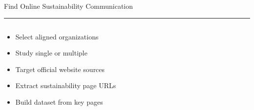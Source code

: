 \documentclass[aspectratio=169]{beamer}
\newcommand{\TitleFont}{\rmfamily}
\begin{document}
\begin{frame}[t]{}
  \vspace*{0.5cm}
  {\TitleFont\fontsize{18}{22}\selectfont\color{LUBronze}Find Online Sustainability Communication\par}
  \vspace{0.3em}
  {\color{LUBronze}\rule{\linewidth}{0.8pt}}\par
  \vspace{0.2cm}
  \begin{columns}[t]
    \begin{column}[t]{0.45\textwidth}
      \vspace*{0pt}
      \begin{itemize}\setlength\itemsep{0.65em}
        \item Select aligned organizations
        \item Study single or multiple
        \item Target official website sources
        \item Extract sustainability page URLs
        \item Build dataset from key pages
      \end{itemize}
    \end{column}
  \end{columns}
\end{frame}
\end{document}
